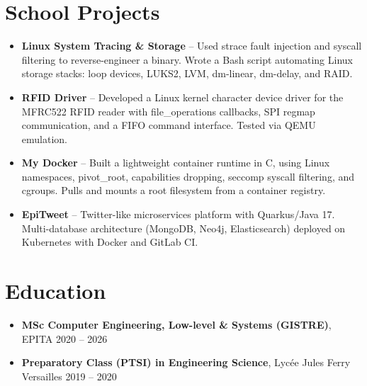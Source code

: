 \documentclass[9pt,a4paper]{article}
\begin{document}
\section*{School Projects}
\begin{tcolorbox}[mybox]
\begin{itemize}
\item \textbf{Linux System Tracing \& Storage} -- Used strace fault injection and syscall filtering to reverse-engineer a binary. Wrote a Bash script automating Linux storage stacks: loop devices, LUKS2, LVM, dm-linear, dm-delay, and RAID.

\item \textbf{RFID Driver} -- Developed a Linux kernel character device driver for the MFRC522 RFID reader with file\_operations callbacks, SPI regmap communication, and a FIFO command interface. Tested via QEMU emulation.

\item \textbf{My Docker} -- Built a lightweight container runtime in C, using Linux namespaces, pivot\_root, capabilities dropping, seccomp syscall filtering, and cgroups. Pulls and mounts a root filesystem from a container registry.

\item \textbf{EpiTweet} -- Twitter-like microservices platform with Quarkus/Java 17. Multi-database architecture (MongoDB, Neo4j, Elasticsearch) deployed on Kubernetes with Docker and GitLab CI.
\end{itemize}
\end{tcolorbox}


\section*{Education}
\begin{tcolorbox}[mybox]
\begin{itemize}
\item \textbf{MSc Computer Engineering, Low-level \& Systems (GISTRE)}, EPITA {\small{\hfill 2020 – 2026}}

\item \textbf{Preparatory Class (PTSI) in Engineering Science}, Lycée Jules Ferry Versailles {\small{\hfill 2019 – 2020}}
\end{itemize}
\end{tcolorbox}
\end{document}
